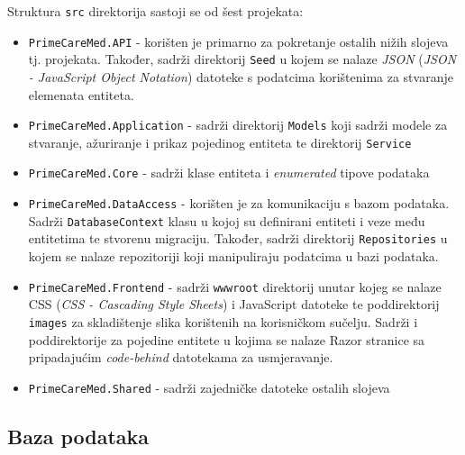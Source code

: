Struktura \texttt{src} direktorija sastoji se od šest projekata: \\
\begin{itemize}
\item \texttt{PrimeCareMed.API} - korišten je primarno za pokretanje ostalih nižih slojeva tj. projekata. Također, sadrži direktorij \texttt{Seed} u kojem se nalaze \textit{JSON} (\textit{JSON - JavaScript Object Notation}) datoteke s podatcima korištenima za stvaranje elemenata entiteta.

\item \texttt{PrimeCareMed.Application} - sadrži direktorij \texttt{Models} koji sadrži modele za stvaranje, ažuriranje i prikaz pojedinog entiteta te direktorij \texttt{Service}

\item \texttt{PrimeCareMed.Core} - sadrži klase entiteta i \textit{enumerated} tipove podataka 

\item \texttt{PrimeCareMed.DataAccess} - korišten je za komunikaciju s bazom podataka. Sadrži \texttt{DatabaseContext} klasu u kojoj su definirani entiteti i veze među entitetima te stvorenu migraciju. Također, sadrži direktorij \texttt{Repositories} u kojem se nalaze repozitoriji koji manipuliraju podatcima u bazi podataka.

\item \texttt{PrimeCareMed.Frontend} - sadrži \texttt{wwwroot} direktorij unutar kojeg se nalaze CSS (\textit{CSS - Cascading Style Sheets}) i JavaScript datoteke te poddirektorij \texttt{images} za skladištenje slika korištenih na korisničkom sučelju. Sadrži i poddirektorije za pojedine entitete u kojima se nalaze Razor stranice sa pripadajućim \textit{code-behind} datotekama za usmjeravanje.

\item \texttt{PrimeCareMed.Shared} - sadrži zajedničke datoteke ostalih slojeva
\end{itemize}

\subsection{Baza podataka}
